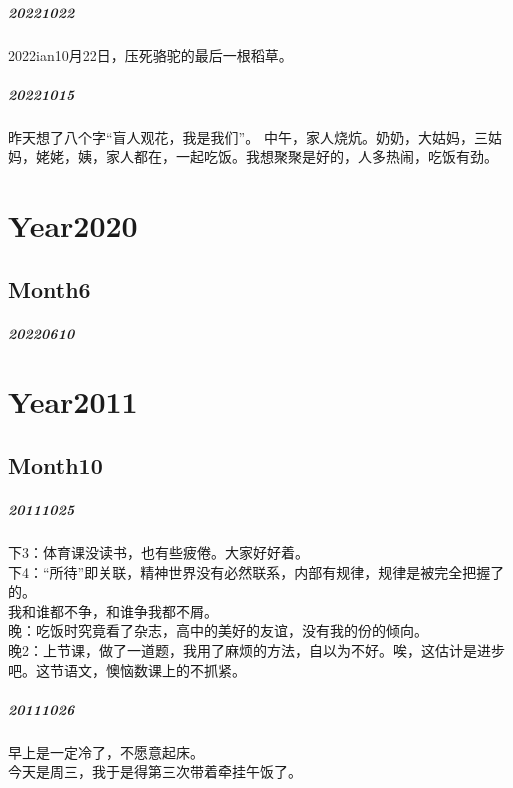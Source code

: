\documentclass[UTF8]{book}
\begin{document}
\paragraph{20221022}
2022ian10月22日，压死骆驼的最后一根稻草。

\paragraph{20221015}
昨天想了八个字“盲人观花，我是我们”。
中午，家人烧炕。奶奶，大姑妈，三姑妈，姥姥，姨，家人都在，一起吃饭。我想聚聚是好的，人多热闹，吃饭有劲。


\chapter{Year2020}
\section{Month6}
\paragraph{20220610}


\chapter{Year2011}
\section{Month10}
\paragraph{20111025}
下3：体育课没读书，也有些疲倦。大家好好着。\\
下4：“所待”即关联，精神世界没有必然联系，内部有规律，规律是被完全把握了的。\\
我和谁都不争，和谁争我都不屑。\\
晚：吃饭时究竟看了杂志，高中的美好的友谊，没有我的份的倾向。\\
晚2：上节课，做了一道题，我用了麻烦的方法，自以为不好。唉，这估计是进步吧。这节语文，懊恼数课上的不抓紧。

\paragraph{20111026}
早上是一定冷了，不愿意起床。\\
今天是周三，我于是得第三次带着牵挂午饭了。
\end{document}
